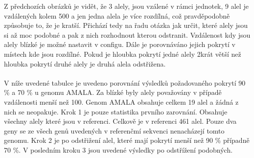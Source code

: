 \documentclass[czech,DP]{thesiskiv}
\numberwithin{equation}{section}
\begin{document}
\noindent
Z předchozích obrázků je vidět, že 3 alely, jsou vzálené v rámci jednotek, 9 alel je vzdálených kolem 500 a jen jedna alela je více rozdílná, což pravděpodobně způsobuje to, že je kratší. Přichází tedy na řadu otázka jak určit, které alely jsou si až moc podobné a pak z nich rozhodnout kterou odstranit. Vzdálenost kdy jsou alely blízké je možné nastavit v configu. Dále je porovnáváno jejich pokrytí v místech kde jsou rozdílné. Pokud je hloubka pokrytí jedné alely 2krát větší než hloubka pokrytí druhé alely je druhá alela odstřižena.
\\
\\
V níže uvedené tabulce je uvedeno porovnání výsledků požadovaného pokrytí 90 \% a 70 \% u genomu AMALA. Za blízké byly alely považovány v případě vzdálenosti menší než 100. Genom AMALA obsahuje celkem 19 alel a žádná z nich se neopakuje. Krok 1 je pouze statistika prvního zarovnání. Obsahuje všechny alely které jsou v referenci. Celkově je v referenci 461 alel. Pouze dva geny se ze všech genů uvedených v referenčmí sekvenci nenacházejí tomto genomu. Krok 2 je po odstřižení alel, které mají pokrytí menší než 90 \% případně 70 \%. V posledním kroku 3 jsou uvedené výsledky po odstřížení podobných. 
\\
\\
\end{document}
